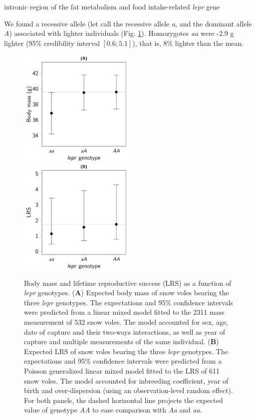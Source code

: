 intronic region of the fat metabolism and food intake-related \emph{lepr} gene

We found a recessive allele (let call the recessive allele \emph{a}, and the dominant allele \emph{A}) associated with lighter individuals (Fig. \ref{fig:leprpheno}). Homozygotes \emph{aa} were -2.9 g lighter (95\% credibility interval $[0.6;5.1]$), that is, 8\% lighter than the mean. 


\begin{figure}[ht]
	\includegraphics[width=0.5\textwidth]{FiguresGeneral/PhenoEffect-1}
	\includegraphics[width=0.5\textwidth]{FiguresGeneral/FitnessEffect-1}
	\caption{Body mass and lifetime reproductive success (LRS) as a function of \emph{lepr} genotypes. 
	(\textbf{A}) Expected body mass of snow voles bearing the three \emph{lepr} genotypes. The expectations and 95\% confidence intervals were predicted from a linear mixed model fitted to the 2311 mass measurement of 532 snow voles. The model accounted for sex, age, date of capture and their two-ways interactions, as well as year of capture and multiple measurements of the same individual.
	(\textbf{B}) Expected LRS of snow voles bearing the three \emph{lepr} genotypes. The expectations and 95\% confidence intervals were predicted from a Poisson generalized linear mixed model fitted to the LRS of 611 snow voles. The model accounted for inbreeding coefficient, year of birth and over-dispersion (using an observation-level random effect). For both panels, the dashed horizontal line projects the expected value of genotype \emph{AA} to ease comparison with \emph{Aa} and \emph{aa}.}
	\label{fig:leprpheno}
\end{figure}

